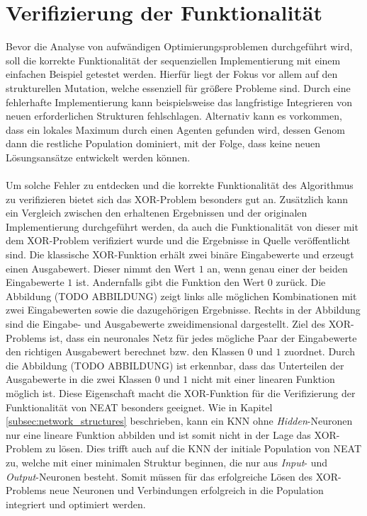 \section{Verifizierung der Funktionalität}
\label{sec:analysis_valdation_functionality}
Bevor die Analyse von aufwändigen Optimierungsproblemen durchgeführt wird, soll die korrekte Funktionalität der sequenziellen Implementierung mit einem einfachen Beispiel getestet werden. Hierfür liegt der Fokus vor allem auf den strukturellen Mutation, welche essenziell für größere Probleme sind. Durch eine fehlerhafte Implementierung kann beispielsweise das langfristige Integrieren von neuen erforderlichen Strukturen fehlschlagen. Alternativ kann es vorkommen, dass ein lokales Maximum durch einen Agenten gefunden wird, dessen Genom dann die restliche Population dominiert, mit der Folge, dass keine neuen Lösungsansätze entwickelt werden können.
\\\\
Um solche Fehler zu entdecken und die korrekte Funktionalität des Algorithmus zu verifizieren bietet sich das XOR-Problem besonders gut an. Zusätzlich kann ein Vergleich zwischen den erhaltenen Ergebnissen und der originalen Implementierung durchgeführt werden, da auch die Funktionalität von dieser mit dem XOR-Problem verifiziert wurde und die Ergebnisse in Quelle \cite{stanley2002evolving} veröffentlicht sind. Die klassische XOR-Funktion erhält zwei binäre Eingabewerte und erzeugt einen Ausgabewert. Dieser nimmt den Wert $1$ an, wenn genau einer der beiden Eingabewerte $1$ ist. Andernfalls gibt die Funktion den Wert $0$ zurück. Die Abbildung (TODO ABBILDUNG) zeigt links alle möglichen Kombinationen mit zwei Eingabewerten sowie die dazugehörigen Ergebnisse. Rechts in der Abbildung sind die Eingabe- und Ausgabewerte zweidimensional dargestellt. Ziel des XOR-Problems ist, dass ein neuronales Netz für jedes mögliche Paar der Eingabewerte den richtigen Ausgabewert berechnet bzw. den Klassen $0$ und $1$ zuordnet. Durch die Abbildung (TODO ABBILDUNG) ist erkennbar, dass das Unterteilen der Ausgabewerte in die zwei Klassen $0$ und $1$ nicht mit einer linearen Funktion möglich ist. Diese Eigenschaft macht die XOR-Funktion für die Verifizierung der Funktionalität von \ac{NEAT} besonders geeignet. Wie in Kapitel \ref{subsec:network_structures} beschrieben, kann ein \ac{KNN} ohne \emph{Hidden}-Neuronen nur eine lineare Funktion abbilden und ist somit nicht in der Lage das XOR-Problem zu lösen. Dies trifft auch auf die \ac{KNN} der initiale Population von \ac{NEAT} zu, welche mit einer minimalen Struktur beginnen, die nur aus \emph{Input}- und \emph{Output}-Neuronen besteht. Somit müssen für das erfolgreiche Lösen des XOR-Problems neue Neuronen und Verbindungen erfolgreich in die Population integriert und optimiert werden. 

